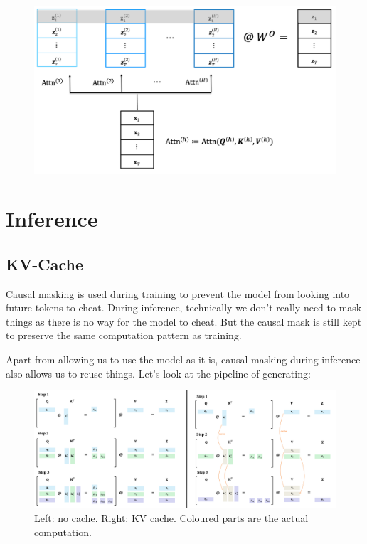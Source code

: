 \documentclass{article}
\begin{document}
\begin{figure}[h]
\centering
\includegraphics[scale=0.4]{imgs/multi-head.png}
\end{figure}


\clearpage
\section{Inference}
\subsection{KV-Cache}
Causal masking is used during training to prevent the model from looking into future tokens to cheat.
During inference, technically we don't really need to mask things as there is no way for the model to cheat.
But the causal mask is still kept to preserve the same computation pattern as training.


Apart from allowing us to use the model as it is, causal masking during inference also allows us to reuse things. 
Let's look at the pipeline of generating:

\begin{figure}[!h]
\centering
\includegraphics[scale=0.25]{imgs/kv-cache.png}
\caption{Left: no cache. Right: KV cache. Coloured parts are the actual computation.}
\end{figure}
\end{document}
